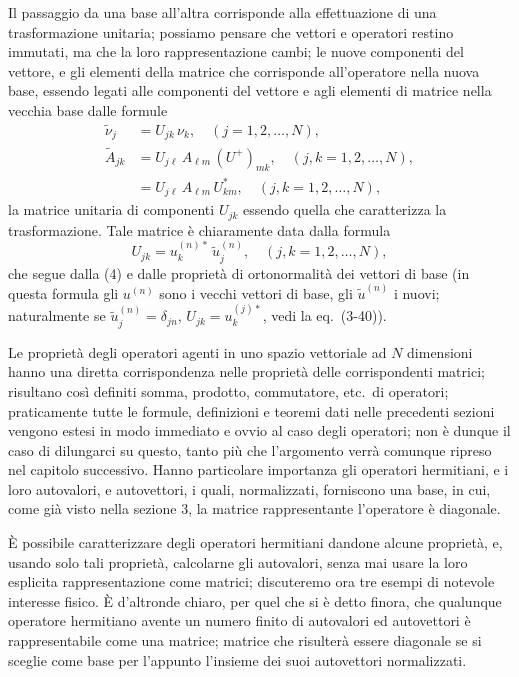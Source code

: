 \documentclass[11pt, a4paper]{book}
\numberwithin{equation}{section}
\begin{document}
Il passaggio da una base all'altra corrisponde alla effettuazione di una
trasformazione unitaria; possiamo pensare che vettori e operatori restino
immutati, ma che la loro rappresentazione cambi; le nuove componenti del
vettore, e gli elementi della matrice che corrisponde all'operatore nella
nuova base, essendo legati alle componenti del vettore e agli elementi di
matrice nella vecchia base dalle formule
\begin{align}
\widetilde{\nu}_j &= U_{jk}\,\nu_k, \quad (j = 1,2,\ldots,N), \tag{10} \\
\widetilde{A}_{jk} &= U_{j\ell}\,A_{\ell m}\,(U^+)_{mk},
  \quad (j,k = 1,2,\ldots,N), \tag{11a} \\
  &= U_{j\ell}\,A_{\ell m}\,U^*_{km},
  \quad (j,k = 1,2,\ldots,N), \tag{11b}
\end{align}
la matrice unitaria di componenti $U_{jk}$ essendo quella che caratterizza
la trasformazione. Tale matrice è chiaramente data dalla formula
\begin{equation}
U_{jk} = u_k^{(n)*}\,\widetilde{u}_j^{(n)},
  \quad (j,k = 1,2,\ldots,N), \tag{12}
\end{equation}
che segue dalla (4) e dalle proprietà di ortonormalità dei vettori di base
(in questa formula gli $u^{(n)}$ sono i vecchi vettori di base, gli
$\widetilde{u}^{(n)}$ i nuovi; naturalmente se $\widetilde{u}_j^{(n)} =
\delta_{jn}$, $U_{jk} = u_k^{(j)*}$, vedi la eq.\ (3-40)).


Le proprietà degli operatori agenti in uno spazio vettoriale ad $N$
dimensioni hanno una diretta corrispondenza nelle proprietà delle
corrispondenti matrici; risultano così definiti somma, prodotto,
commutatore, etc.\ di operatori; praticamente tutte le formule, definizioni
e teoremi dati nelle precedenti sezioni vengono estesi in modo immediato e
ovvio al caso degli operatori; non è dunque il caso di dilungarci su questo,
tanto più che l'argomento verrà comunque ripreso nel capitolo successivo.
Hanno particolare importanza gli operatori hermitiani, e i loro autovalori,
e autovettori, i quali, normalizzati, forniscono una base, in cui, come già
visto nella sezione 3, la matrice rappresentante l'operatore è diagonale.

È possibile caratterizzare degli operatori hermitiani dandone alcune
proprietà, e, usando solo tali proprietà, calcolarne gli autovalori, senza
mai usare la loro esplicita rappresentazione come matrici; discuteremo ora
tre esempi di notevole interesse fisico. È d'altronde chiaro, per quel che
si è detto finora, che qualunque operatore hermitiano avente un numero
finito di autovalori ed autovettori è rappresentabile come una matrice;
matrice che risulterà essere diagonale se si sceglie come base per l'appunto
l'insieme dei suoi autovettori normalizzati.
\end{document}
